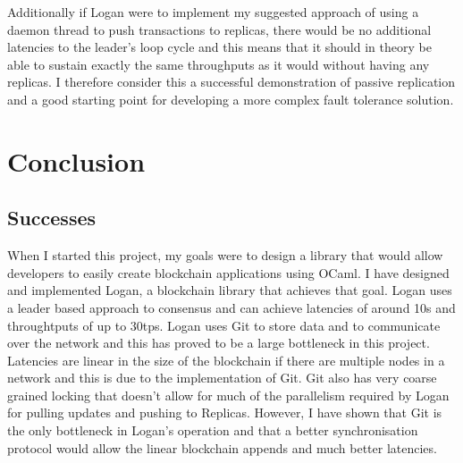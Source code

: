 \documentclass[12pt,a4paper,twoside,openright]{report}
\begin{document}
	Additionally if Logan were to implement my suggested approach of using a daemon thread to push transactions to replicas, there would be no additional latencies to the leader's loop cycle and this means that it should in theory be able to sustain exactly the same throughputs as it would without having any replicas.
	I therefore consider this a successful demonstration of passive replication and a good starting point for developing a more complex fault tolerance solution.

	\chapter{Conclusion}
	\section{Successes}
	When I started this project, my goals were to design a library that would allow developers to easily create blockchain applications using OCaml.
	I have designed and implemented Logan, a blockchain library that achieves that goal.
	Logan uses a leader based approach to consensus and can achieve latencies of around 10s and throughtputs of up to 30tps.
	Logan uses Git to store data and to communicate over the network and this has proved to be a large bottleneck in this project. 
	Latencies are linear in the size of the blockchain if there are multiple nodes in a network and this is due to the implementation of Git.
	Git also has very coarse grained locking that doesn't allow for much of the parallelism required by Logan for pulling updates and pushing to Replicas.
	However, I have shown that Git is the only bottleneck in Logan's operation and that a better synchronisation protocol would allow the linear blockchain appends and much better latencies. 
\end{document}
